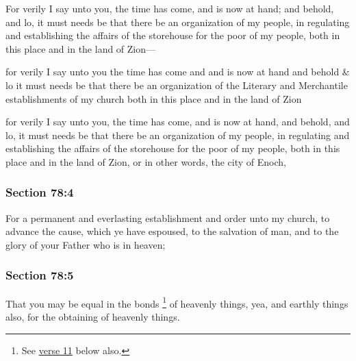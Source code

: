 		For verily I say unto you, the time has come, and is now at hand; and behold, and lo, it must needs be that there be an organization of my people, in regulating and establishing the affairs of the storehouse for the poor of my people, both in this place and in the land of Zion---

		\begin{framed}
		\scriptsize
			\begin{compactdesc}
				\item[JSP] for verily I say unto you the time has come and and is now at hand and behold \& lo it must needs be that there be an organization of the Literary and Merchantile establishments of my church both in this place and in the land of Zion
				\item[DC 1835] for verily I say unto you, the time has come, and is now at hand, and behold, and lo, it must needs be that there be an organization of my people, in regulating and establishing the affairs of the storehouse for the poor of my people, both in this place and in the land of Zion, or in other words, the city of Enoch,
			\end{compactdesc}
		\end{framed}

	\subsubsection{Section 78:4} %
		\label{DC78-4}

		For a permanent and everlasting establishment and order unto my church, to advance the cause, which ye have espoused, to the salvation of man, and to the glory of your Father who is in heaven;


	\subsubsection{Section 78:5} %
		\label{DC78-5}

		That you may be equal in the bonds%
			\footnote{%
				See \hyperref[DC78-11]{verse 11} below also.
				} 
		of heavenly things, yea, and earthly things also, for the obtaining of heavenly things.

